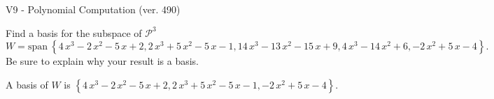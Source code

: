 \begin{exercise}
  \begin{exerciseTitle}V9 - Polynomial Computation (ver. 490)\end{exerciseTitle}
  \begin{exerciseStatement}
    Find a basis for the subspace of \(\mathcal{P}^3\) 
\[W=\mathrm{span}\ \left\{4 \, x^{3} - 2 \, x^{2} - 5 \, x + 2 , 2 \, x^{3} + 5 \, x^{2} - 5 \, x - 1 , 14 \, x^{3} - 13 \, x^{2} - 15 \, x + 9 , 4 \, x^{3} - 14 \, x^{2} + 6 , -2 \, x^{2} + 5 \, x - 4\right\}.\]
 Be sure to explain why your result is a basis.


  \end{exerciseStatement}
  \begin{exerciseAnswer}
   A basis of \(W\) is  \(\left\{4 \, x^{3} - 2 \, x^{2} - 5 \, x + 2 , 2 \, x^{3} + 5 \, x^{2} - 5 \, x - 1 , -2 \, x^{2} + 5 \, x - 4\right\}\).
  


  \end{exerciseAnswer}
\end{exercise}